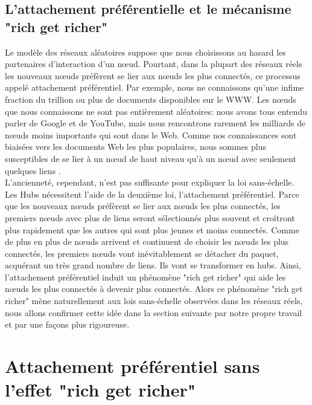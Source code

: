 \begin{sloppypar}
\subsection{L'attachement préférentielle et le mécanisme "rich get richer"}
\end{sloppypar}
Le modèle des réseaux aléatoires suppose que nous choisissons au hasard les partenaires d'interaction d'un nœud. Pourtant, dans la plupart des réseaux réels les nouveaux nœuds préfèrent se lier aux nœuds les plus connectés, ce processus appelé attachement préférentiel. Par exemple, nous ne connaissons qu'une infime fraction du trillion ou plus de documents disponibles sur le WWW. Les nœuds que nous connaissons ne sont pas entièrement aléatoires: nous avons tous entendu parler de Google et de YouTube, mais nous rencontrons rarement les milliards de nœuds moins importants qui sont dans le Web. Comme nos connaissances sont biaisées vers les documents Web les plus populaires, nous sommes plus susceptibles de se lier à un nœud de haut niveau qu'à un nœud avec seulement quelques liens \cite{Barabasi2002}.\\
L'ancienneté, cependant, n'est pas suffisante pour expliquer la loi sans-échelle. Les Hubs nécessitent l'aide de la deuxième loi, l'attachement préférentiel. Parce que les nouveaux nœuds préfèrent se lier aux nœuds les plus connectés, les premiers nœuds avec plus de liens seront sélectionnés plus souvent et croîtront plus rapidement que les autres qui sont plus jeunes et moins connectés. Comme de plus en plus de nœuds arrivent et continuent de choisir les nœuds les plus connectés, les premiers nœuds vont inévitablement se détacher du paquet, acquérant un très grand nombre de liens. Ils vont se transformer en hubs. Ainsi, l'attachement préférentiel induit un phénomène "rich get richer" qui aide les nœuds les plus connectés à devenir plus connectés. Alors ce phénomène "rich get richer" mène naturellement aux lois sans-échelle observées dans les réseaux réels, nous allons confirmer cette idée dans la section suivante par notre propre travail et par une façons plus rigoureuse.
\begin{sloppypar}
\section{Attachement préférentiel sans l'effet "rich get richer"}
\end{sloppypar}
